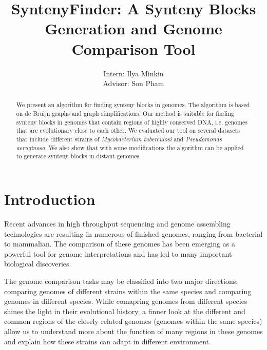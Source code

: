 \documentclass[a4paper, 12pt]{scrartcl}
\begin{document}
\title{SyntenyFinder: A Synteny Blocks Generation and Genome Comparison Tool}
\author{Intern: Ilya Minkin\\
	Advisor: Son Pham}
\date{}
\maketitle
{}

\onehalfspacing

\begin{abstract}
We present an algorithm for finding synteny blocks in genomes. The algorithm is based on de Bruijn graphs and graph simplifications.
Our method is suitable for finding synteny blocks in genomes that contain regions of highly conserved DNA, i.e. genomes that are evolutionary
close to each other. We evaluated our tool on several datasets that include different strains of \textit{Mycobacterium tuberculosi} and 
\textit{Pseudomonas aeruginosa}. We also show that with some modifications the algorithm can be applied to generate synteny blocks in
distant genomes. 
\end{abstract}

\section{Introduction}

Recent advances in high throughput sequencing and genome assembling technologies are resulting in numerous of 
finished genomes, ranging from bacterial to mammalian. The comparison of these genomes has been emerging as a powerful
tool for genome interpretations and has led to many important biological discoveries.

The genome comparison tasks may be classified into two major directions: comparing genomes of different strains within the same species
and comparing genomes in different species. While comapring genomes from different species shines the light in their evolutional history, 
a finner look at the different and common regions of the closely related genomes (genomes within the same species) allow us to understand 
more about the function of many regions in these genomes and explain how these strains can adapt in different environment. 


\end{document}
